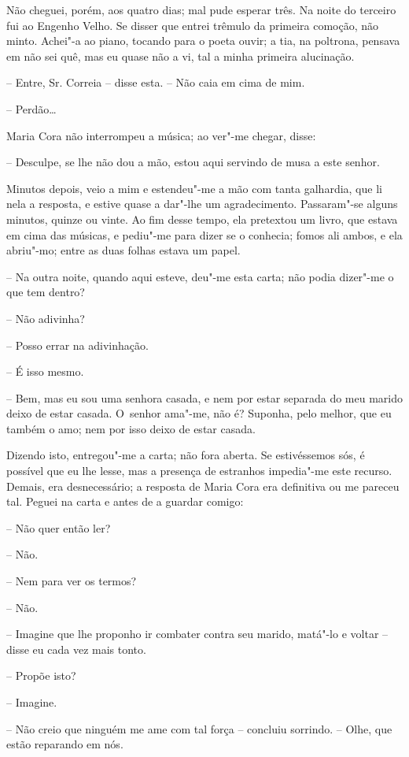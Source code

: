 Não cheguei, porém, aos quatro dias; mal pude esperar três. Na noite do
terceiro fui ao Engenho Velho. Se disser que entrei trêmulo da primeira
comoção, não minto. Achei"-a ao piano, tocando para o poeta ouvir; a tia,
na poltrona, pensava em não sei quê, mas eu quase não a vi, tal a minha
primeira alucinação.

-- Entre, Sr. Correia -- disse esta. -- Não caia em cima de mim.

-- Perdão\ldots{}

Maria Cora não interrompeu a música; ao ver"-me chegar, disse:

-- Desculpe, se lhe não dou a mão, estou aqui servindo de musa a este
senhor.

Minutos depois, veio a mim e estendeu"-me a mão com tanta galhardia, que
li nela a resposta, e estive quase a dar"-lhe um agradecimento.
Passaram"-se alguns minutos, quinze ou vinte. Ao fim desse tempo, ela
pretextou um livro, que estava em cima das músicas, e pediu"-me para
dizer se o conhecia; fomos ali ambos, e ela abriu"-mo; entre as duas
folhas estava um papel.

-- Na outra noite, quando aqui esteve, deu"-me esta carta; não podia
dizer"-me o que tem dentro?

-- Não adivinha?

-- Posso errar na adivinhação.

-- É isso mesmo.

-- Bem, mas eu sou uma senhora casada, e nem por estar separada do meu
marido deixo de estar casada. O~senhor ama"-me, não é? Suponha, pelo
melhor, que eu também o amo; nem por isso deixo de estar casada.

Dizendo isto, entregou"-me a carta; não fora aberta. Se estivéssemos sós,
é possível que eu lhe lesse, mas a presença de estranhos impedia"-me este
recurso. Demais, era desnecessário; a resposta de Maria Cora era
definitiva ou me pareceu tal. Peguei na carta e antes de a guardar
comigo:

-- Não quer então ler?

-- Não.

-- Nem para ver os termos?

-- Não.

-- Imagine que lhe proponho ir combater contra seu marido, matá"-lo e
voltar -- disse eu cada vez mais tonto.

-- Propõe isto?

-- Imagine.

-- Não creio que ninguém me ame com tal força -- concluiu sorrindo. --
Olhe, que estão reparando em nós.

